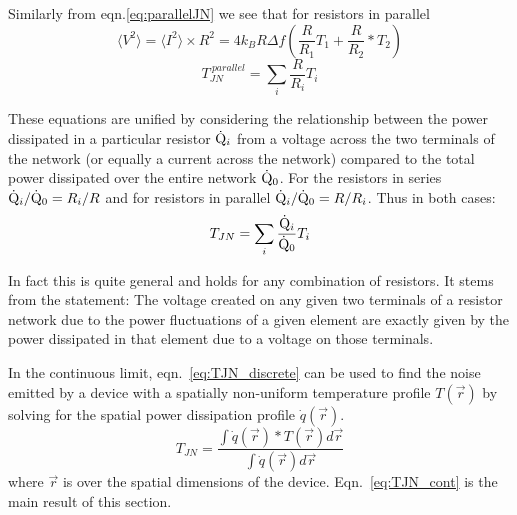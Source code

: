 Similarly from eqn.\ref{eq:parallelJN} we see that for resistors in parallel
\begin{equation}
\langle V^2\rangle = \langle I^2\rangle\times R^2 = 4k_BR\Delta f (\frac{R}{R_1}T_1+\frac{R}{R_2}*T_2)
\end{equation}
\begin{equation}
T_{JN}^{\ parallel} = \sum_i \frac{R}{R_i}T_i
\end{equation}

These equations are unified by considering the relationship between the power dissipated in a particular resistor $\dot{\mathrm{Q}}_i$ from a voltage across the two terminals of the network (or equally a current across the network) compared to the total power dissipated over the entire network $\dot{\mathrm{Q}}_0$. For the resistors in series $\dot{\mathrm{Q}}_i/\dot{\mathrm{Q}}_0 = R_i/R$ and for resistors in parallel $\dot{\mathrm{Q}}_i/\dot{\mathrm{Q}}_0 = R/R_i$. Thus in both cases:
\begin{equation}\label{eq:TJN_discrete}
T_{JN} = \sum_i\frac{\dot{\mathrm{Q}}_i}{\dot{\mathrm{Q}}_0}T_i
\end{equation}

In fact this is quite general and holds for any combination of resistors. It stems from the statement: The voltage created on any given two terminals of a resistor network due to the power fluctuations of a given element are exactly given by the power dissipated in that element due to a voltage on those terminals.

In the continuous limit, eqn.~\ref{eq:TJN_discrete} can be used to find the noise emitted by a device with a spatially non-uniform temperature profile $T(\vec{r})$ by solving for the spatial power dissipation profile $\dot{q}(\vec{r})$.
\begin{equation}\label{eq:TJN_cont}
T_{JN} = \frac{\int \dot{q}(\vec{r})*T(\vec{r}) d\vec{r}}{\int \dot{q}(\vec{r}) d\vec{r}}
\end{equation}
where $\vec{r}$ is over the spatial dimensions of the device. Eqn.~\ref{eq:TJN_cont} is the main result of this section.


